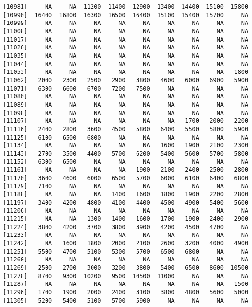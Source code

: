 \documentclass[]{article}
\begin{document}
\begin{verbatim}
[10981]     NA     NA  11200  11400  12900  13400  14400  15100  15800
[10990]  16400  16800  16300  16500  16400  15100  15400  15700     NA
[10999]     NA     NA     NA     NA     NA     NA     NA     NA     NA
[11008]     NA     NA     NA     NA     NA     NA     NA     NA     NA
[11017]     NA     NA     NA     NA     NA     NA     NA     NA     NA
[11026]     NA     NA     NA     NA     NA     NA     NA     NA     NA
[11035]     NA     NA     NA     NA     NA     NA     NA     NA     NA
[11044]     NA     NA     NA     NA     NA     NA     NA     NA     NA
[11053]     NA     NA     NA     NA     NA     NA     NA     NA   1800
[11062]   2000   2300   2500   2900   3800   4600   6000   6900   5900
[11071]   6300   6600   6700   7200   7500     NA     NA     NA     NA
[11080]     NA     NA     NA     NA     NA     NA     NA     NA     NA
[11089]     NA     NA     NA     NA     NA     NA     NA     NA     NA
[11098]     NA     NA     NA     NA     NA     NA     NA     NA     NA
[11107]     NA     NA     NA     NA     NA     NA   1700   2000   2200
[11116]   2400   2800   3600   4500   5800   6400   5500   5800   5900
[11125]   6100   6500   6800     NA     NA     NA     NA     NA     NA
[11134]     NA     NA     NA     NA     NA   1600   1900   2100   2300
[11143]   2700   3500   4400   5700   6200   5400   5600   5700   5800
[11152]   6300   6500     NA     NA     NA     NA     NA     NA     NA
[11161]     NA     NA     NA     NA   1900   2100   2400   2500   2800
[11170]   3600   4600   6000   6500   5700   6000   6100   6400   6800
[11179]   7100     NA     NA     NA     NA     NA     NA     NA     NA
[11188]     NA     NA     NA   1400   1600   1800   1900   2200   2800
[11197]   3400   4200   4800   4100   4400   4500   4900   5400   5600
[11206]     NA     NA     NA     NA     NA     NA     NA     NA     NA
[11215]     NA     NA   1300   1400   1600   1700   1900   2400   2900
[11224]   3800   4200   3700   3800   3900   4200   4500   4700     NA
[11233]     NA     NA     NA     NA     NA     NA     NA     NA     NA
[11242]     NA   1600   1800   2000   2100   2600   3200   4000   4900
[11251]   5500   4700   5100   5300   5700   6500   6800     NA     NA
[11260]     NA     NA     NA     NA     NA     NA     NA     NA     NA
[11269]   2500   2700   3000   3200   3800   5400   6500   8600  10500
[11278]   8700   9300  10200   9500  10500  11000     NA     NA     NA
[11287]     NA     NA     NA     NA     NA     NA     NA     NA   1500
[11296]   1700   1900   2000   2400   3100   3800   4800   5600   5000
[11305]   5200   5400   5100   5700   5900     NA     NA     NA     NA

\end{verbatim}
\end{document}
